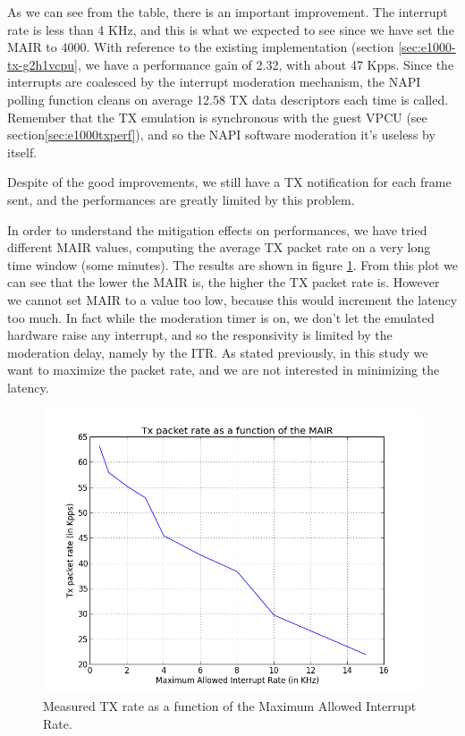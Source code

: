 As we can see from the table, there is an important improvement. The interrupt rate is less than 4 KHz, and this is what we expected to see
since we have set the MAIR to 4000.
With reference to the existing implementation (section \ref{sec:e1000-tx-g2h1vcpu}, we have a performance gain of 2.32, with about 47 Kpps.
Since the interrupts are coalesced by the interrupt moderation mechanism, the NAPI polling function cleans on average 12.58 TX data 
descriptors each time is called. Remember that the TX emulation is synchronous with the guest VPCU (see section\ref{sec:e1000txperf}), and
so the NAPI software moderation it's useless by itself.

Despite of the good improvements, we still have a TX notification for each frame sent, and the performances are greatly limited by this
problem.

\vspace{0.5cm}

In order to understand the mitigation effects on performances, we have tried different MAIR values, computing the average TX packet 
rate on a very long time window (some minutes). The results are shown in figure \ref{fig:itr-vs-txrate}.
From this plot we can see that the lower the MAIR is, the higher the TX packet rate is. However we cannot set MAIR to a value too low,
because this would increment the latency too much. In fact while the moderation timer is on, we don't let the emulated hardware raise
any interrupt, and so the responsivity is limited by the moderation delay, namely by the ITR.
As stated previously, in this study we want to maximize the packet rate, and we are not interested in minimizing the latency.

\begin{figure}[bt]
\centering
\includegraphics[scale = 0.7]{MAIR-vs-TXRate.png}
\caption{Measured TX rate as a function of the Maximum Allowed Interrupt Rate.}
\label{fig:itr-vs-txrate}
\end{figure}

